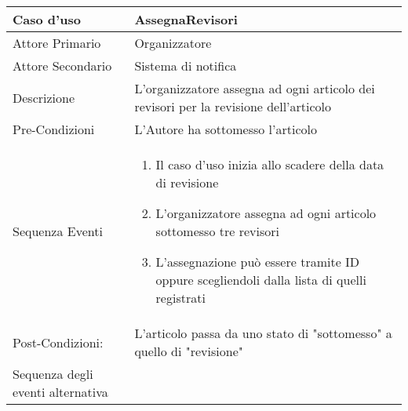 \begin{tabular}{|p{3cm}|p{7cm}|}
\hline 
\rowcolor{Orchid}
Caso d'uso & AssegnaRevisori \\
\hline
Attore Primario & Organizzatore\\
\hline
Attore Secondario & Sistema di notifica\\
\hline
Descrizione &L'organizzatore  assegna ad ogni articolo dei revisori per la revisione dell'articolo\\
\hline
Pre-Condizioni& L'Autore ha sottomesso l'articolo\\
\hline
  Sequenza Eventi&
                   \begin{enumerate}
                   \item Il caso d'uso inizia allo scadere della data di revisione
                   \item L'organizzatore assegna ad ogni articolo sottomesso tre revisori
                   \item L'assegnazione può essere tramite ID oppure scegliendoli dalla lista di quelli registrati
                   \end{enumerate}\\
\hline
Post-Condizioni: &L'articolo passa da uno stato di "sottomesso" a quello di "revisione" \\
\hline
Sequenza degli eventi alternativa & \\
\hline
\end{tabular}

